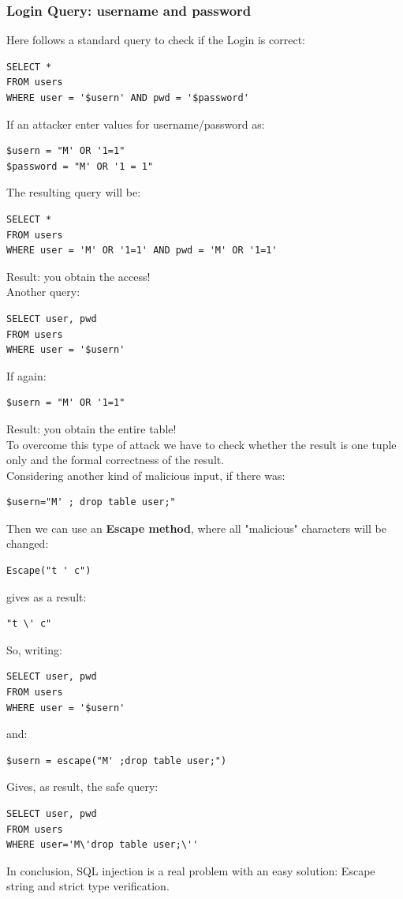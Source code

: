 \subsubsection{Login Query: username and password} 
Here follows a standard query to check if the Login is correct:
\begin{lstlisting}
SELECT * 
FROM users 
WHERE user = '$usern' AND pwd = '$password'
\end{lstlisting}
If an attacker enter values for username/password as:
\begin{lstlisting}
$usern = "M' OR '1=1"
$password = "M' OR '1 = 1"
\end{lstlisting}
The resulting query will be:
\begin{lstlisting}
SELECT * 
FROM users 
WHERE user = 'M' OR '1=1' AND pwd = 'M' OR '1=1'
\end{lstlisting}
Result: you obtain the access!\\
Another query:
\begin{lstlisting}
SELECT user, pwd 
FROM users 
WHERE user = '$usern' 
\end{lstlisting}
If again:
\begin{lstlisting}
$usern = "M' OR '1=1" 
\end{lstlisting}
Result: you obtain the entire table!\\
To overcome this type of attack we have to check whether the result is one tuple only and the formal correctness of the result. \\
\linebreak
Considering another kind of malicious input, if there was:  
\begin{lstlisting} 
$usern="M' ; drop table user;"
\end{lstlisting}
Then we can use an \textbf{Escape method}, where all "malicious" characters will be changed:
\begin{lstlisting} 
Escape("t ' c") 
\end{lstlisting}
gives as a result:
\begin{lstlisting} 
"t \' c"
\end{lstlisting}
So, writing:
\begin{lstlisting} 
SELECT user, pwd 
FROM users 
WHERE user = '$usern'
\end{lstlisting}
and:
\begin{lstlisting} 
$usern = escape("M' ;drop table user;")
\end{lstlisting}
Gives, as result, the safe query:
\begin{lstlisting} 
SELECT user, pwd 
FROM users 
WHERE user='M\'drop table user;\''
\end{lstlisting}
In conclusion, SQL injection is a real problem with an easy solution: Escape string and strict type verification.
